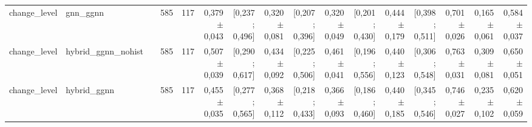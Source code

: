 \begin{table}[htbp]
{\begin{tabular}{llrrrrrrrrrrrrrr}
change\_level & gnn\_ggnn &  & 585 & 117 & 0,379 $\pm$ 0,043 & [0,237 ; 0,496] & 0,320 $\pm$ 0,081 & [0,207 ; 0,396] & 0,320 $\pm$ 0,049 & [0,201 ; 0,430] & 0,444 $\pm$ 0,179 & [0,398 ; 0,511] & 0,701 $\pm$ 0,026 & 0,165 $\pm$ 0,061 & 0,584 $\pm$ 0,037 \\
change\_level & hybrid\_ggnn\_nohist &  & 585 & 117 & 0,507 $\pm$ 0,039 & [0,290 ; 0,617] & 0,434 $\pm$ 0,092 & [0,225 ; 0,506] & 0,461 $\pm$ 0,041 & [0,196 ; 0,556] & 0,440 $\pm$ 0,123 & [0,306 ; 0,548] & 0,763 $\pm$ 0,031 & 0,309 $\pm$ 0,081 & 0,650 $\pm$ 0,051 \\
change\_level & hybrid\_ggnn &  & 585 & 117 & 0,455 $\pm$ 0,035 & [0,277 ; 0,565] & 0,368 $\pm$ 0,112 & [0,218 ; 0,433] & 0,366 $\pm$ 0,093 & [0,186 ; 0,460] & 0,440 $\pm$ 0,185 & [0,345 ; 0,546] & 0,746 $\pm$ 0,027 & 0,235 $\pm$ 0,102 & 0,620 $\pm$ 0,059 \\
\bottomrule
\end{tabular}}
\end{table}
